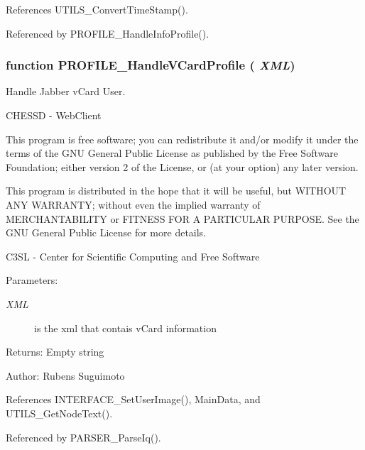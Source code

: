 References UTILS\_\-ConvertTimeStamp().

Referenced by PROFILE\_\-HandleInfoProfile().
\subsubsection[PROFILE\_\-HandleVCardProfile]{\setlength{\rightskip}{0pt plus 5cm}function PROFILE\_\-HandleVCardProfile ( {\em XML})}\label{profile_2profile_8js_a586925d93cc9cb8533756778acacce2}


Handle Jabber vCard User. 

CHESSD - WebClient

This program is free software; you can redistribute it and/or modify it under the terms of the GNU General Public License as published by the Free Software Foundation; either version 2 of the License, or (at your option) any later version.

This program is distributed in the hope that it will be useful, but WITHOUT ANY WARRANTY; without even the implied warranty of MERCHANTABILITY or FITNESS FOR A PARTICULAR PURPOSE. See the GNU General Public License for more details.

C3SL - Center for Scientific Computing and Free Software \begin{Desc}
\item[Parameters:]
\begin{description}
\item[{\em XML}]is the xml that contais vCard information \end{description}
\end{Desc}
\begin{Desc}
\item[Returns:]Empty string \end{Desc}
\begin{Desc}
\item[Author:]Rubens Suguimoto \end{Desc}


References INTERFACE\_\-SetUserImage(), MainData, and UTILS\_\-GetNodeText().

Referenced by PARSER\_\-ParseIq().
